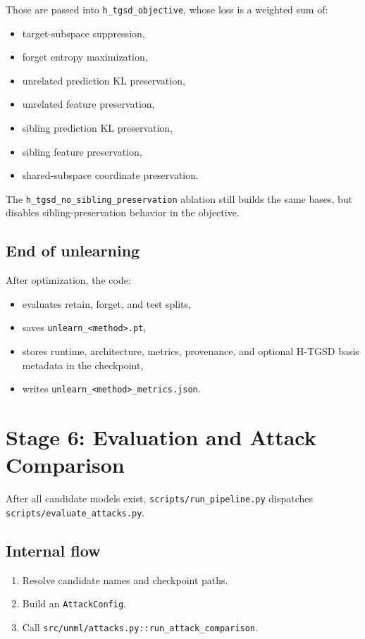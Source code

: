 \documentclass[10pt,a4paper]{article}
\begin{document}
Those are passed into \texttt{h\_tgsd\_objective}, whose loss is a weighted sum of:
\begin{itemize}
  \item target-subspace suppression,
  \item forget entropy maximization,
  \item unrelated prediction KL preservation,
  \item unrelated feature preservation,
  \item sibling prediction KL preservation,
  \item sibling feature preservation,
  \item shared-subspace coordinate preservation.
\end{itemize}

The \texttt{h\_tgsd\_no\_sibling\_preservation} ablation still builds the same bases, but disables sibling-preservation behavior in the objective.

\subsection{End of unlearning}
After optimization, the code:
\begin{itemize}
  \item evaluates retain, forget, and test splits,
  \item saves \texttt{unlearn\_<method>.pt},
  \item stores runtime, architecture, metrics, provenance, and optional H-TGSD basis metadata in the checkpoint,
  \item writes \texttt{unlearn\_<method>\_metrics.json}.
\end{itemize}

\section{Stage 6: Evaluation and Attack Comparison}
After all candidate models exist, \texttt{scripts/run\_pipeline.py} dispatches \texttt{scripts/evaluate\_attacks.py}.

\subsection{Internal flow}
\begin{enumerate}
  \item Resolve candidate names and checkpoint paths.
  \item Build an \texttt{AttackConfig}.
  \item Call \texttt{src/unml/attacks.py::run\_attack\_comparison}.
\end{enumerate}
\end{document}
